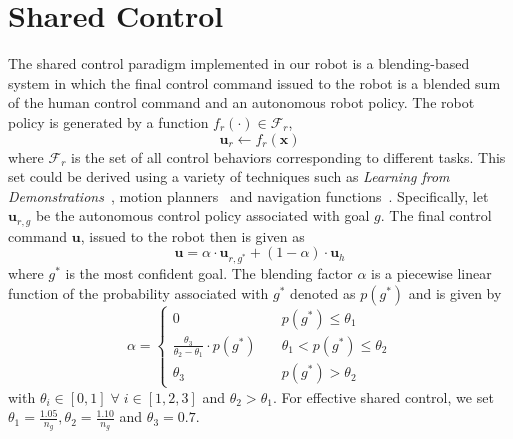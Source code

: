\section{Shared Control}\label{sec:shared-control}
The shared control paradigm implemented in our robot is a blending-based system in  which the final control command issued to the robot is a blended sum of the human control command and an autonomous robot policy.
The robot policy is generated by a function $f_{r}(\cdot) \in \mathcal{F}_{r}$, 
\begin{equation*}
\boldsymbol{u}_r \leftarrow f_{r}(\boldsymbol{x})
\end{equation*}
where $\mathcal{F}_{r}$ is the set of all control behaviors corresponding to different tasks. This set could be derived using a variety of techniques such as \textit{Learning from Demonstrations}~\cite{argall2009survey, schaal1997learning, khansari2011learning, calinon2012statistical}, motion planners~\cite{hsu2002randomized,ratliff2009chomp} and navigation functions~\cite{rimon1992exact,tanner2003nonholonomic}. Specifically, let $\boldsymbol{u}_{r,g}$ be the autonomous control policy associated with goal $g$. The final control command $\boldsymbol{u}$, issued to the robot then is given as 
\begin{equation*}
\boldsymbol{u} = \alpha\cdot \boldsymbol{u}_{r,g^*} + (1 - \alpha)\cdot \boldsymbol{u}_h
\end{equation*}
where $g^*$ is the most confident goal. The blending factor $\alpha$ is a piecewise linear function of the probability associated with $g^*$ denoted as $p(g^*)$ and is given by
$$
\alpha = \left\{
\begin{array}{ll}
0 & \quad p(g^*) \leq \theta_1 \\
\frac{\theta_3}{\theta_2 - \theta_1}\cdot p(g^*) &  \quad \theta_1 < p(g^*) \leq \theta_2  \\
\theta_3 & \quad p(g^*) > \theta_2 	
\end{array}
\right.
$$
with $\theta_i \in [0, 1] \;\forall\; i \in [1,2,3]$ and $ \theta_2 > \theta_1$. 
For effective shared control, we set $\theta_1 = \frac{1.05}{n_g}, \theta_2 = \frac{1.10}{n_g}$ and $ \theta_3 = 0.7$.

